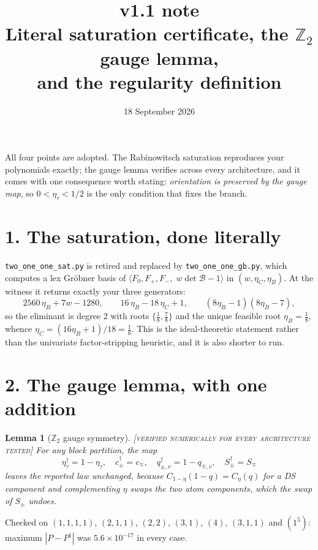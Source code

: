 \documentclass[11pt]{article}
\title{\textbf{v1.1 note}\\[2pt]
\large Literal saturation certificate, the $\mathbb Z_2$ gauge lemma,\\ and the regularity definition}
\author{18 September 2026}
\date{}
\newtheorem{lemma}{Lemma}
\theoremstyle{remark}
\newcommand{\status}[1]{\hfill{\normalfont\small\textsc{[#1]}}}
\begin{document}
\maketitle
\vspace{-2.5em}

All four points are adopted. The Rabinowitsch saturation reproduces your polynomials exactly; the gauge lemma verifies across every architecture, and it comes with one consequence worth stating: \emph{orientation is preserved by the gauge map}, so $0<\eta_\tau<1/2$ is the only condition that fixes the branch.

\section*{1. The saturation, done literally}

\texttt{two\_one\_one\_sat.py} is retired and replaced by \texttt{two\_one\_one\_gb.py}, which computes a lex Gr\"obner basis of
$\langle F_0,F_+,F_-,\;w\det\mathcal B-1\rangle$ in $(w,\eta_C,\eta_B)$. At the witness it returns exactly your three generators:
\[
2560\,\eta_B+7w-1280,\qquad 16\,\eta_B-18\,\eta_C+1,\qquad (8\eta_B-1)(8\eta_B-7),
\]
so the eliminant is degree 2 with roots $\{\tfrac18,\tfrac78\}$ and the unique feasible root $\eta_B=\tfrac18$, whence $\eta_C=(16\eta_B+1)/18=\tfrac16$. This is the ideal-theoretic statement rather than the univariate factor-stripping heuristic, and it is also shorter to run.

\section*{2. The gauge lemma, with one addition}

\begin{lemma}[$\mathbb Z_2$ gauge symmetry]\status{verified numerically for every architecture tested}
For any block partition, the map
\[
\eta_\tau^\dagger=1-\eta_\tau,\quad c_\pm^\dagger=c_\mp,\quad q^\dagger_{\pm,v}=1-q_{\mp,v},\quad S^\dagger_\pm=S_\mp
\]
leaves the reported law unchanged, because $C_{1-\eta}(1-q)=C_\eta(q)$ for a DS component and complementing $\eta$ swaps the two atom components, which the swap of $S_\pm$ undoes.
\end{lemma}

Checked on $(1,1,1,1)$, $(2,1,1)$, $(2,2)$, $(3,1)$, $(4)$, $(3,1,1)$ and $(1^5)$: maximum $|P-P^\dagger|$ was $5.6\times10^{-17}$ in every case.
\end{document}
